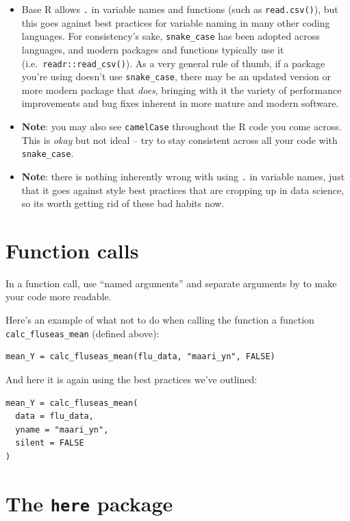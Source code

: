 \documentclass[]{book}
\begin{document}
\begin{itemize}
\item
  Base R allows \texttt{.} in variable names and functions (such as \texttt{read.csv()}), but this goes against best practices for variable naming in many other coding languages. For consistency's sake, \texttt{snake\_case} has been adopted across languages, and modern packages and functions typically use it (i.e.~\texttt{readr::read\_csv()}). As a very general rule of thumb, if a package you're using doesn't use \texttt{snake\_case}, there may be an updated version or more modern package that \emph{does}, bringing with it the variety of performance improvements and bug fixes inherent in more mature and modern software.
\item
  \textbf{Note}: you may also see \texttt{camelCase} throughout the R code you come across. This is \emph{okay} but not ideal -- try to stay consistent across all your code with \texttt{snake\_case}.
\item
  \textbf{Note}: there is nothing inherently wrong with using \texttt{.} in variable names, just that it goes against style best practices that are cropping up in data science, so its worth getting rid of these bad habits now.
\end{itemize}

\hypertarget{function-calls}{%
\section{Function calls}\label{function-calls}}

In a function call, use ``named arguments'' and separate arguments by to make your code more readable.

Here's an example of what not to do when calling the function a function \texttt{calc\_fluseas\_mean} (defined above):

\begin{verbatim}
mean_Y = calc_fluseas_mean(flu_data, "maari_yn", FALSE)
\end{verbatim}

And here it is again using the best practices we've outlined:

\begin{verbatim}
mean_Y = calc_fluseas_mean(
  data = flu_data, 
  yname = "maari_yn",
  silent = FALSE
)
\end{verbatim}

\hypertarget{the-here-package}{%
\section{\texorpdfstring{The \texttt{here} package}{The here package}}\label{the-here-package}}
\end{document}
